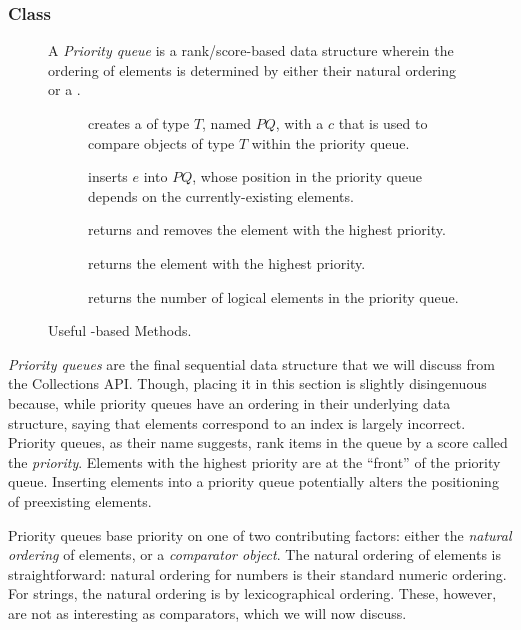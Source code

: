 \subsubsection*{ Class}
\begin{figure}[tp]
  \small
  \begin{tcolorbox}[title=Java PriorityQueue]
    A \textit{Priority queue} is a rank/score-based data structure wherein the ordering of elements is determined by either their natural ordering or a .
    \vspace{2ex}
  \begin{description}
    \item [] creates a  of type $T$, named $PQ$, with a  $c$ that is used to compare objects of type $T$ within the priority queue.
     \item [] inserts $e$ into $PQ$, whose position in the priority queue depends on the currently-existing elements.
     \item [] returns and removes the element with the highest priority.
     \item [] returns the element with the highest priority.
    \item [] returns the number of logical elements in the priority queue.
  \end{description}
\end{tcolorbox}
  \caption{Useful -based Methods.}
  \label{fig:priorityqueues}
\end{figure}

\textit{Priority queues} are the final sequential data structure that we will discuss from the Collections API\@. Though, placing it in this section is slightly disingenuous because, while priority queues have an ordering in their underlying data structure, saying that elements correspond to an index is largely incorrect. Priority queues, as their name suggests, rank items in the queue by a score called the \textit{priority}. Elements with the highest priority are at the ``front'' of the priority queue. Inserting elements into a priority queue potentially alters the positioning of preexisting elements.

Priority queues base priority on one of two contributing factors: either the \textit{natural ordering} of elements, or a \textit{comparator object}. The natural ordering of elements is straightforward: natural ordering for numbers is their standard numeric ordering. For strings, the natural ordering is by lexicographical ordering. These, however, are not as interesting as comparators, which we will now discuss.

